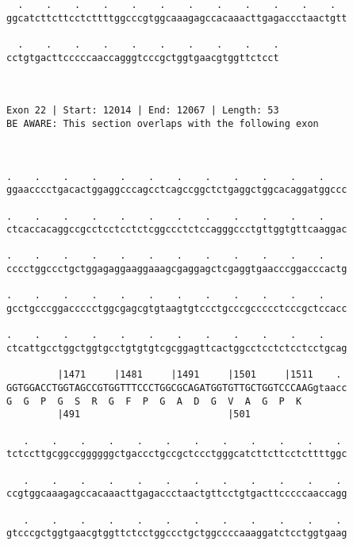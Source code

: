 \documentclass{article}
\begin{document}
\begin{Verbatim}
  .    .    .    .    .    .    .    .    .    .    .    .  
ggcatcttcttcctcttttggcccgtggcaaagagccacaaacttgagaccctaactgtt
                                                            
  .    .    .    .    .    .    .    .    .    .
cctgtgacttcccccaaccagggtcccgctggtgaacgtggttctcct
                                                
                                                
 
Exon 22 | Start: 12014 | End: 12067 | Length: 53
BE AWARE: This section overlaps with the following exon



.    .    .    .    .    .    .    .    .    .    .    .    
ggaacccctgacactggaggcccagcctcagccggctctgaggctggcacaggatggccc
                                                            
.    .    .    .    .    .    .    .    .    .    .    .    
ctcaccacaggccgcctcctcctctcggccctctccagggccctgttggtgttcaaggac
                                                            
.    .    .    .    .    .    .    .    .    .    .    .    
cccctggccctgctggagaggaaggaaagcgaggagctcgaggtgaacccggacccactg
                                                            
.    .    .    .    .    .    .    .    .    .    .    .    
gcctgcccggaccccctggcgagcgtgtaagtgtccctgcccgccccctcccgctccacc
                                                            
.    .    .    .    .    .    .    .    .    .    .    .    
ctcattgcctggctggtgcctgtgtgtcgcggagttcactggcctcctctcctcctgcag
                                                            
         |1471     |1481     |1491     |1501     |1511    . 
GGTGGACCTGGTAGCCGTGGTTTCCCTGGCGCAGATGGTGTTGCTGGTCCCAAGgtaacc
G  G  P  G  S  R  G  F  P  G  A  D  G  V  A  G  P  K        
         |491                          |501                 
  
   .    .    .    .    .    .    .    .    .    .    .    . 
tctccttgcggccggggggctgaccctgccgctccctgggcatcttcttcctcttttggc
                                                            
   .    .    .    .    .    .    .    .    .    .    .    . 
ccgtggcaaagagccacaaacttgagaccctaactgttcctgtgacttcccccaaccagg
                                                            
   .    .    .    .    .    .    .    .    .    .    .    . 
gtcccgctggtgaacgtggttctcctggccctgctggccccaaaggatctcctggtgaag
                                                            

\end{Verbatim}
\end{document}
